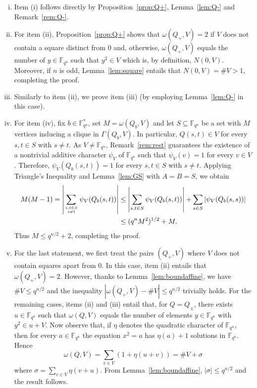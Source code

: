 \documentclass[11pt]{amsart}
\newcommand{\G}{\Gamma}
\newcommand{\F}{\mathbb F}
\theoremstyle{definition}
\theoremstyle{remark}
\begin{document}
\begin{enumerate}[(i)]
    \item Item (i) follows directly by Proposition~\ref{prop:Q+}, Lemma~\ref{lem:Q-} and Remark~\ref{rem:Q-}. 

\item For item (ii), Proposition~\ref{prop:Q+} shows that $\omega(Q_+, V)=2$ if $V$ does not contain a square distinct from $0$ and, otherwise, $\omega(Q_+, V)$ equals the number of $y\in \F_{q^n}$ such that $y^2\in V$ which is, by definition, $N(0, V)$.
Moreover, if $n$ is odd, Lemma~\ref{lem:square} entails that $N(0, V)=\# V>1$, completing the proof.

\item Similarly to item (ii), we prove item (iii) (by employing Lemma~\ref{lem:Q-} in this case).

\item For item (iv), fix $b\in \F_{q^n}^*$, set $M=\omega(Q_b, V)$ and let $S\subseteq \F_{q^n}$ be a set with $M$ vertices inducing a clique in $\G(Q_b, V)$. In particular, $Q(s, t)\in V$ for every $s, t\in S$ with $s\ne t$. As $V\ne \F_{q^n}$, Remark~\ref{rem:rest} guarantees the existence of a nontrivial additive character $\psi_V$ of $\F_{q^n}$ such that $\psi_V(v)=1$ for every $v\in V$. Therefore, $\psi_V(Q_b(s, t))=1$ for every $s, t\in S$ with $s\ne t$. Applying Triangle's Inequality and Lemma~\ref{lem:GS} with $A=B=S$, we obtain 
\begin{align*}M(M-1)=\left|\sum_{s, t\in S\atop s\ne t}\psi_{V}(Q_b(s, t))\right| &\le \left|\sum_{s, t\in S}\psi_{V}(Q_b(s, t))\right|+\sum_{s\in S}|\psi_{V}(Q_b(s, s))|\\ &\le (q^nM^2)^{1/2}+M.\end{align*}
Thus $M\le q^{n/2}+2$, completing the proof.

\item For the last statement, we first treat the pairs $(Q_+, V)$ where $V$ does not contain squares apart from $0$. In this case, item (ii) entails that $\omega(Q_+, V)=2$. However, thanks to Lemma~\ref{lem:boundaffine}, we have $\# V\le q^{n/2}$ and the inequality $|\omega(Q_+, V)-\# V|\le q^{n/2}$ trivially holds. For the remaining cases, items (ii) and (iii) entail that, for $Q=Q_{\pm}$, there exists $u\in \F_{q^n}$ such that $\omega(Q, V)$ equals the number of elements $y\in \F_{q^n}$ with $y^2\in u+V$. Now observe that, if $\eta$ denotes the quadratic character of $\F_{q^n}$, then for every $a\in \F_{q^n}$ the equation $x^2=a$ has $\eta(a)+1$ solutions in $\F_{q^n}$. Hence 
$$\omega(Q, V)=\sum_{v\in V}(1+\eta(u+v))=\# V+\sigma$$
where $\sigma=\sum_{v\in V}\eta(v+u)$. From Lemma~\ref{lem:boundaffine}, $|\sigma|\le q^{n/2}$ and the result follows.
\end{enumerate}
\end{document}
